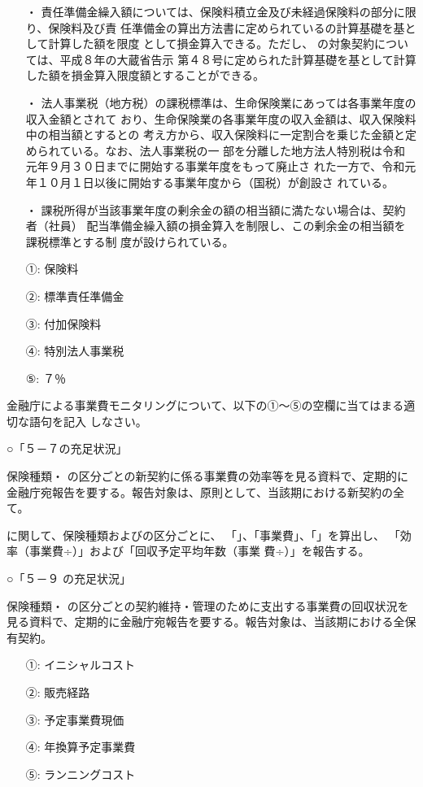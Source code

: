 \documentclass[report,gutter=10mm,fore-edge=10mm,uplatex,dvipdfmx]{jlreq}
\begin{document}
\begin{itemize}
\item[・] 責任準備金繰入額については、保険料積立金及び未経過保険料の部分に限り、保険料及び責
任準備金の算出方法書に定められているの計算基礎を基として計算した額を限度
として損金算入できる。ただし、
の対象契約については、平成８年の大蔵省告示
第４８号に定められた計算基礎を基として計算した額を損金算入限度額とすることができる。
\item[・] 法人事業税（地方税）の課税標準は、生命保険業にあっては各事業年度の収入金額とされて
おり、生命保険業の各事業年度の収入金額は、収入保険料中の相当額とするとの
考え方から、収入保険料に一定割合を乗じた金額と定められている。なお、法人事業税の一
部を分離した地方法人特別税は令和元年９月３０日までに開始する事業年度をもって廃止さ
れた一方で、令和元年１０月１日以後に開始する事業年度から（国税）が創設さ
れている。
\item[・] 課税所得が当該事業年度の剰余金の額の相当額に満たない場合は、契約者（社員）
配当準備金繰入額の損金算入を制限し、この剰余金の相当額を課税標準とする制
度が設けられている。
\end{itemize}
\answer{}
\begin{itemize}
\item[ ①: ] 保険料
\item[ ②: ] 標準責任準備金
\item[ ③: ] 付加保険料
\item[ ④: ] 特別法人事業税
\item[ ⑤: ] ７％
\end{itemize}

\problem{2020 生保２問題 1(4)【監督指針】]}
金融庁による事業費モニタリングについて、以下の①～⑤の空欄に当てはまる適切な語句を記入
しなさい。

\noindent ○「５－７の充足状況」

保険種類・
の区分ごとの新契約に係る事業費の効率等を見る資料で、定期的に
金融庁宛報告を要する。報告対象は、原則として、当該期における新契約の全て。

に関して、保険種類およびの区分ごとに、
「」、「事業費」、「」を算出し、
「効率（事業費÷）」および「回収予定平均年数（事業
費÷）」を報告する。

\noindent ○「５－９ の充足状況」

保険種類・
の区分ごとの契約維持・管理のために支出する事業費の回収状況を
見る資料で、定期的に金融庁宛報告を要する。報告対象は、当該期における全保有契約。
\answer{}
\begin{itemize}
\item[ ①: ] イニシャルコスト
\item[ ②: ] 販売経路
\item[ ③: ] 予定事業費現価
\item[ ④: ] 年換算予定事業費
\item[ ⑤: ] ランニングコスト
\end{itemize}
\end{document}
